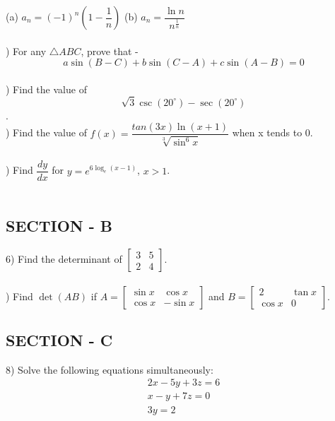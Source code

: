 \documentclass[12pt]{article}
\begin{document}
(a) $a_n = (-1)^n(1 - \dfrac{1}{n})$ \hspace{15mm} (b) $a_n = \dfrac{\ln n}{n^{\frac{1}{n}}}$\\\\

) For any $\triangle ABC$, prove that -\\
$$a \sin (B-C) + b \sin (C - A) + c \sin (A-B) = 0$$\\

) Find the value of $$\sqrt{3} \csc (20^{\circ}) - \sec (20^{\circ})$$.\\

) Find the value of $f(x) = \dfrac{tan(3x) \ln (x+1)}{\sqrt[3]{\sin^6 x}}$ when x tends to 0.\\\\

) Find $\dfrac{dy}{dx}$ for $ y = e^{6 \log_e (x-1)}$, $ x > 1$.\\\\

\subsection{SECTION - B}
\vspace{2mm}
6) Find the determinant of 
$\begin{bmatrix}
3 & 5 \\ 2 & 4
\end{bmatrix}$.\\\\

) Find $\det (AB)$ if  $A = \begin{bmatrix}
\sin x & \cos x \\ \cos x & -\sin x
\end{bmatrix}$  and  $B = \begin{bmatrix}
2 & \tan x \\ \cos x & 0
\end{bmatrix}$.

\newpage

\subsection{SECTION - C}
\vspace{2mm}
8) Solve the following equations simultaneously:
\begin{align}
2x - 5 y + 3z = 6\\
x - y + 7z = 0\\
3y = 2
\end{align}\\
\end{document}

